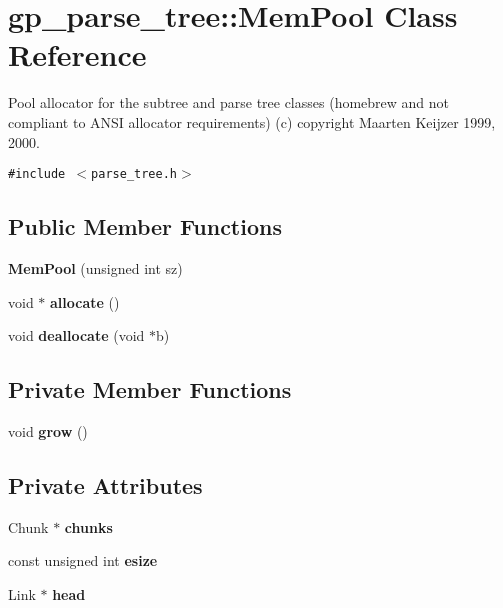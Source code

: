 \section{gp\_\-parse\_\-tree::Mem\-Pool Class Reference}
\label{classgp__parse__tree_1_1_mem_pool}
Pool allocator for the subtree and parse tree classes (homebrew and not compliant to ANSI allocator requirements) (c) copyright Maarten Keijzer 1999, 2000.  


{\tt \#include $<$parse\_\-tree.h$>$}

\subsection*{Public Member Functions}
\begin{CompactItemize}
\item 
{\bf Mem\-Pool} (unsigned int sz)\label{classgp__parse__tree_1_1_mem_pool_a0}

\item 
void $\ast$ {\bf allocate} ()\label{classgp__parse__tree_1_1_mem_pool_a2}

\item 
void {\bf deallocate} (void $\ast$b)\label{classgp__parse__tree_1_1_mem_pool_a3}

\end{CompactItemize}
\subsection*{Private Member Functions}
\begin{CompactItemize}
\item 
void {\bf grow} ()\label{classgp__parse__tree_1_1_mem_pool_d0}

\end{CompactItemize}
\subsection*{Private Attributes}
\begin{CompactItemize}
\item 
Chunk $\ast$ {\bf chunks}\label{classgp__parse__tree_1_1_mem_pool_r0}

\item 
const unsigned int {\bf esize}\label{classgp__parse__tree_1_1_mem_pool_r1}

\item 
Link $\ast$ {\bf head}\label{classgp__parse__tree_1_1_mem_pool_r2}

\end{CompactItemize}


